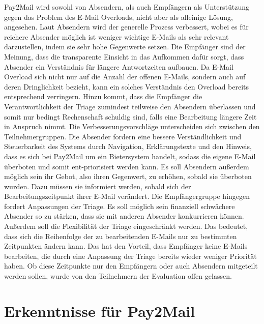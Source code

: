 Pay2Mail wird sowohl von Absendern, als auch Empfängern als Unterstützung gegen das Problem des E-Mail Overloads, nicht aber als alleinige Lösung, angesehen. Laut Absendern wird der generelle Prozess verbessert, wobei es für reichere Absender möglich ist weniger wichtige E-Mails als sehr relevant darzustellen, indem sie sehr hohe Gegenwerte setzen. Die Empfänger sind der Meinung, dass die transparente Einsicht in das Aufkommen dafür sorgt, dass Absender ein Verständnis für längere Antwortzeiten aufbauen. Da E-Mail Overload sich nicht nur auf die Anzahl der offenen E-Mails, sondern auch auf deren Dringlichkeit bezieht, kann ein solches Verständnis den Overload bereits entsprechend verringern. Hinzu kommt, dass die Empfänger die Verantwortlichkeit der Triage zumindest teilweise den Absendern überlassen und somit nur bedingt Rechenschaft schuldig sind, falls eine Bearbeitung längere Zeit in Anspruch nimmt. Die Verbesserungsvorschläge unterscheiden sich zwischen den Teilnehmergruppen. Die Absender fordern eine bessere Verständlichkeit und Steuerbarkeit des Systems durch Navigation, Erklärungstexte und den Hinweis, dass es sich bei Pay2Mail um ein Bietersystem handelt, sodass die eigene E-Mail überboten und somit ent-priorisiert werden kann. Es soll Absendern außerdem möglich sein ihr Gebot, also ihren Gegenwert, zu erhöhen, sobald sie überboten wurden. Dazu müssen sie informiert werden, sobald sich der Bearbeitungszeitpunkt ihrer E-Mail verändert. Die Empfängergruppe hingegen fordert Anpassungen der Triage. Es soll möglich sein finanziell schwächere Absender so zu stärken, dass sie mit anderen Absender konkurrieren können. Außerdem soll die Flexibilität der Triage eingeschränkt werden. Das bedeutet, dass sich die Reihenfolge der zu bearbeitenden E-Mails nur zu bestimmten Zeitpunkten ändern kann. Das hat den Vorteil, dass Empfänger keine E-Mails bearbeiten, die durch eine Anpassung der Triage bereits wieder weniger Priorität haben. Ob diese Zeitpunkte nur den Empfängern oder auch Absendern mitgeteilt werden sollen, wurde von den Teilnehmern der Evaluation offen gelassen.

\section{Erkenntnisse für Pay2Mail}
\label{Erkenntnisse_für_Pay2Mail}

